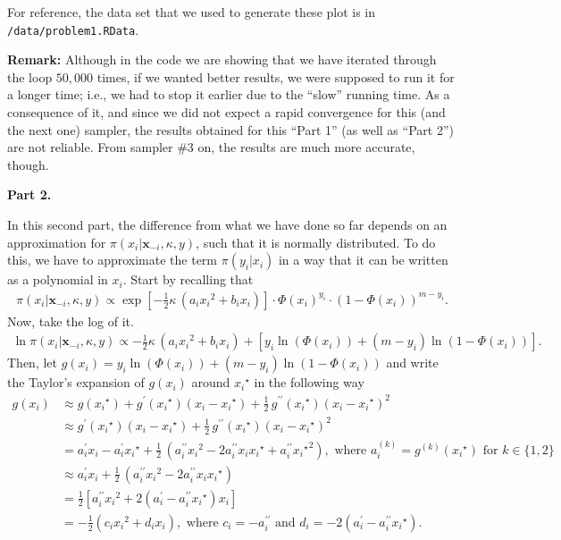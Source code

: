 \documentclass[12pt]{article}\usepackage[]{graphicx}\usepackage[]{color}
\begin{document}
For reference, the data set that we used to generate these plot is in \texttt{/data/problem1.RData}.

\textbf{Remark:} Although in the code we are showing that we have iterated through the loop $50,000$ times, if we wanted better results, we were supposed to run it for a longer time; i.e., we had to stop it earlier due to the ``slow'' running time. As a consequence of it, and since we did not expect a rapid convergence for this (and the next one) sampler, the results obtained for this ``Part 1'' (as well as ``Part 2'') are not reliable. From sampler \#3 on, the results are much more accurate, though.

\newpage

\textbf{Part 2.}

In this second part, the difference from what we have done so far depends on an approximation for $\pi(x_i|\boldsymbol{x}_{-i}, \kappa, y)$, such that it is normally distributed. To do this, we have to approximate the term $\pi(y_i|x_i)$ in a way that it can be written as a polynomial in $x_i$. Start by recalling that 
\begin{align*}
\pi(x_i|\boldsymbol{x}_{-i}, \kappa, y) \propto \exp\left[-\frac{1}{2} \kappa  \, (a_i {x_i}^2 + b_i x_i) \right] \cdot \Phi(x_i)^{y_i} \cdot (1 - \Phi(x_i))^{m - y_i}.
\end{align*}
Now, take the log of it. 
\begin{align}
\label{ln-eq}
\ln \pi(x_i|\boldsymbol{x}_{-i}, \kappa, y) \propto -\frac{1}{2} \kappa  \, (a_i {x_i}^2 + b_i x_i) +  \left[y_i \ln(\Phi(x_i)) + (m - y_i) \ln(1 - \Phi(x_i))\right].
\end{align}
Then, let $g(x_i) = y_i \ln(\Phi(x_i)) + (m - y_i) \ln(1 - \Phi(x_i))$ and write the Taylor's expansion of $g(x_i)$ around ${x_i}^{\star}$ in the following way
\begin{align*}
g(x_i) &\approx g({x_i}^{\star}) + g^{\prime}({x_i}^{\star})(x_i - {x_i}^{\star}) + \frac{1}{2} \, g^{\prime\prime}({x_i}^{\star}) (x_i - {x_i}^{\star})^2 \\
       &\approx  g^{\prime}({x_i}^{\star})(x_i - {x_i}^{\star}) + \frac{1}{2} \, g^{\prime\prime}({x_i}^{\star}) (x_i - {x_i}^{\star})^2 \\
       &= a_i^{\prime}x_i - a_i^{\prime}{x_i}^{\star} + \frac{1}{2}\,(a_i^{\prime\prime}{x_i}^2 - 2a_i^{\prime\prime}x_i {x_i}^{\star} + a_i^{\prime\prime}{{x_i}^{\star}}^2), \text{ where } a_i^{(k)} = g^{(k)}({x_i}^{\star}) \text{ for } k \in \{1, 2\} \\
       &\approx a_i^{\prime}x_i  + \frac{1}{2}\,(a_i^{\prime\prime}{x_i}^2 - 2a_i^{\prime\prime}x_i {x_i}^{\star}) \\
       &=\frac{1}{2}\left[a_i^{\prime\prime}{x_i}^2 + 2(a_i^{\prime} - a_i^{\prime\prime}{x_i}^{\star}) x_i\right] \\
       &=-\frac{1}{2}(c_i {x_i}^2 + d_i x_i), \text{ where } c_i = -{a}^{\prime\prime}_i \text{ and } d_i = -2(a_i^{\prime} - a_i^{\prime\prime}{x_i}^{\star}). 
\end{align*}
\end{document}
